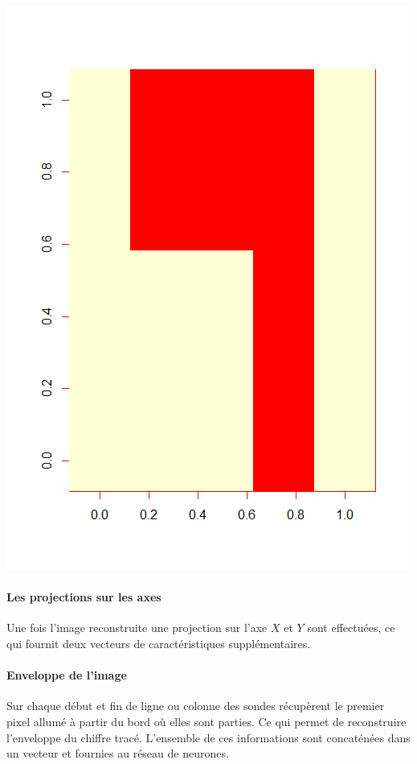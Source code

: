 \begin{minipage}{0.2\linewidth}
\includegraphics[width = \textwidth]{Figures/data9}
\end{minipage}




\paragraph{Les projections sur les axes} Une fois l'image reconstruite une projection sur l'axe $X$ et $Y$ sont effectuées, ce qui fournit deux vecteurs de caractéristiques supplémentaires.
\paragraph{Enveloppe de l'image} Sur chaque début et fin de ligne ou colonne des sondes récupèrent le premier pixel allumé à partir du bord où elles sont parties. Ce qui permet de reconstruire l'enveloppe du chiffre tracé. L'ensemble de ces informations sont concaténées dans un vecteur et fournies au réseau de neurones.


